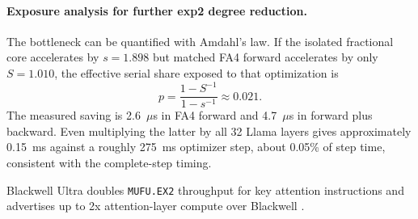 \paragraph{Exposure analysis for further exp2 degree reduction.}
The bottleneck can be quantified with Amdahl's law. If the isolated fractional
core accelerates by $s=1.898$ but matched FA4 forward accelerates by only
$S=1.010$, the effective serial share exposed to that optimization is
\begin{equation}
    p=\frac{1-S^{-1}}{1-s^{-1}}\approx 0.021.
    \label{eq:exp2-amdahl}
\end{equation}
The measured saving is 2.6~$\mu$s in FA4 forward and 4.7~$\mu$s in
forward plus backward. Even multiplying the latter by all 32 Llama layers
gives approximately 0.15~ms against a roughly 275~ms optimizer step, about
0.05\% of step time, consistent with the complete-step timing.

Blackwell Ultra doubles \texttt{MUFU.EX2} throughput for key attention instructions and
advertises up to 2x attention-layer compute over Blackwell
\cite{nvidia2026blackwellultrasoftmax,aubrey2025blackwellultra}.

\FloatBarrier
